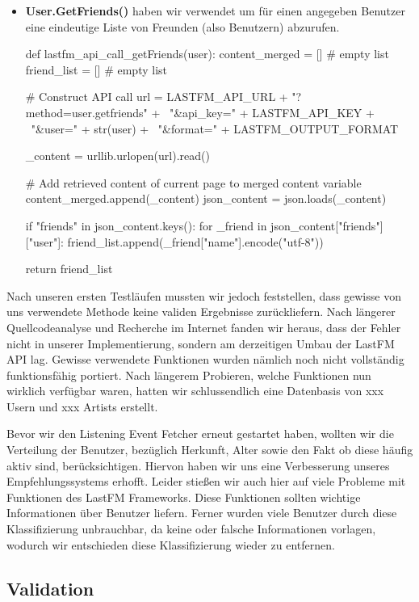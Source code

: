 \documentclass[prodmode,acmtecs]{acmsmall} %
\begin{document}
\begin{itemize}
\item \textbf{User.GetFriends()} haben wir verwendet um für einen angegeben Benutzer eine eindeutige Liste von Freunden (also Benutzern) abzurufen.
\begin{python}
def lastfm_api_call_getFriends(user):
    content_merged = []         # empty list
    friend_list = []            # empty list

    # Construct API call
    url = LASTFM_API_URL + "?method=user.getfriends" + \
        "&api_key=" + LASTFM_API_KEY + \
        "&user=" + str(user) + \
        "&format=" + LASTFM_OUTPUT_FORMAT

    _content = urllib.urlopen(url).read()

    # Add retrieved content of current page to merged content variable
    content_merged.append(_content)
    json_content = json.loads(_content)

    if "friends" in json_content.keys():
        for _friend in json_content["friends"]["user"]:
            friend_list.append(_friend["name"].encode("utf-8"))

    return friend_list
\end{python}
\end{itemize}

Nach unseren ersten Testläufen mussten wir jedoch feststellen, dass gewisse von uns verwendete Methode keine validen Ergebnisse zurückliefern. Nach längerer Quellcodeanalyse und Recherche im Internet fanden wir heraus, dass der Fehler nicht in unserer Implementierung, sondern am derzeitigen Umbau der LastFM API lag. Gewisse verwendete Funktionen wurden nämlich noch nicht vollständig funktionsfähig portiert. Nach längerem Probieren, welche Funktionen nun wirklich verfügbar waren, hatten wir schlussendlich eine Datenbasis von xxx Usern und xxx Artists erstellt.

Bevor wir den Listening Event Fetcher erneut gestartet haben, wollten wir die Verteilung der Benutzer, bezüglich Herkunft, Alter sowie den Fakt ob diese häufig aktiv sind, berücksichtigen. Hiervon haben wir uns eine Verbesserung unseres Empfehlungssystems erhofft. Leider stießen wir auch hier auf viele Probleme mit Funktionen des LastFM Frameworks. Diese Funktionen sollten wichtige Informationen über Benutzer liefern. Ferner wurden viele Benutzer durch diese Klassifizierung unbrauchbar, da keine oder falsche Informationen vorlagen, wodurch wir entschieden diese Klassifizierung wieder zu entfernen.

\subsection{Validation}
\end{document}

